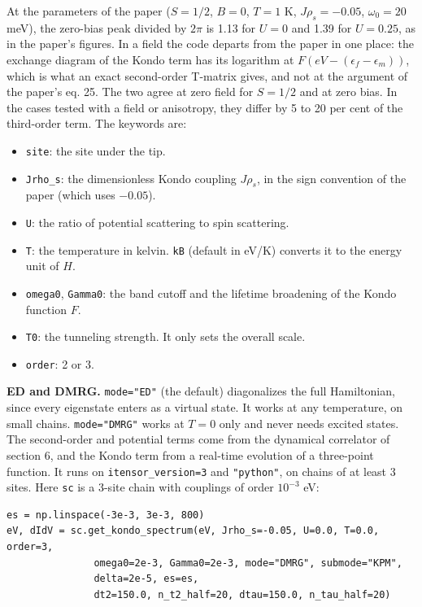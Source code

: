 \documentclass[11pt]{article}
\providecommand{\tightlist}{\setlength{\itemsep}{0pt}\setlength{\parskip}{0pt}}
\begin{document}
At the parameters of the paper (\(S=1/2\), \(B=0\), \(T=1\) K,
\(J\rho_s=-0.05\), \(\omega_0=20\) meV), the zero-bias peak divided by \(2\pi\)
is 1.13 for \(U=0\) and 1.39 for \(U=0.25\), as in the paper's figures. In a
field the code departs from the paper in one place: the exchange diagram
of the Kondo term has its logarithm at \(F(eV-(\epsilon_f-\epsilon_m))\),
which is what an exact second-order T-matrix gives, and not at the
argument of the paper's eq. 25. The two agree at zero field for \(S=1/2\)
and at zero bias. In the cases tested with a field or anisotropy, they
differ by 5 to 20 per cent of the third-order term. The keywords are:

\begin{itemize}
\tightlist
\item
  \texttt{site}: the site under the tip.
\item
  \texttt{Jrho\_\allowbreak{}s}: the dimensionless Kondo coupling \(J\rho_s\), in the sign
  convention of the paper (which uses \(-0.05\)).
\item
  \texttt{U}: the ratio of potential scattering to spin scattering.
\item
  \texttt{T}: the temperature in kelvin. \texttt{kB} (default in eV/K) converts it to
  the energy unit of \(H\).
\item
  \texttt{omega0}, \texttt{Gamma0}: the band cutoff and the lifetime broadening of the
  Kondo function \(F\).
\item
  \texttt{T0}: the tunneling strength. It only sets the overall scale.
\item
  \texttt{order}: 2 or 3.
\end{itemize}

\textbf{ED and DMRG.} \texttt{mode="ED"} (the default) diagonalizes the full
Hamiltonian, since every eigenstate enters as a virtual state. It works
at any temperature, on small chains. \texttt{mode="DMRG"}
works at \(T=0\) only and never needs excited states. The second-order and
potential terms come from the dynamical correlator of section 6, and the
Kondo term from a real-time evolution of a three-point function. It runs
on \texttt{itensor\_\allowbreak{}version=3} and \texttt{"python"}, on chains of at least 3 sites.
Here \texttt{sc} is a 3-site chain with couplings of order \(10^{-3}\) eV:

\begin{lstlisting}
es = np.linspace(-3e-3, 3e-3, 800)
eV, dIdV = sc.get_kondo_spectrum(eV, Jrho_s=-0.05, U=0.0, T=0.0, order=3,
               omega0=2e-3, Gamma0=2e-3, mode="DMRG", submode="KPM",
               delta=2e-5, es=es,
               dt2=150.0, n_t2_half=20, dtau=150.0, n_tau_half=20)
\end{lstlisting}
\end{document}
